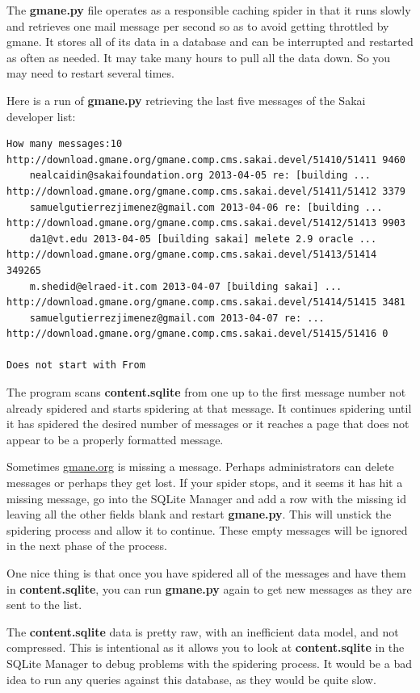 The {\bf gmane.py} file operates as a responsible caching spider in 
that it runs slowly and retrieves one mail message per second so 
as to avoid getting throttled by gmane.   It stores all of
its data in a database and can be interrupted and restarted 
as often as needed.   It may take many hours to pull all the data
down.  So you may need to restart several times.

Here is a run of {\bf gmane.py} retrieving the last five messages of the
Sakai developer list:

\beforeverb
\begin{verbatim}
How many messages:10
http://download.gmane.org/gmane.comp.cms.sakai.devel/51410/51411 9460
    nealcaidin@sakaifoundation.org 2013-04-05 re: [building ...
http://download.gmane.org/gmane.comp.cms.sakai.devel/51411/51412 3379
    samuelgutierrezjimenez@gmail.com 2013-04-06 re: [building ...
http://download.gmane.org/gmane.comp.cms.sakai.devel/51412/51413 9903
    da1@vt.edu 2013-04-05 [building sakai] melete 2.9 oracle ...
http://download.gmane.org/gmane.comp.cms.sakai.devel/51413/51414 349265
    m.shedid@elraed-it.com 2013-04-07 [building sakai] ...
http://download.gmane.org/gmane.comp.cms.sakai.devel/51414/51415 3481
    samuelgutierrezjimenez@gmail.com 2013-04-07 re: ...
http://download.gmane.org/gmane.comp.cms.sakai.devel/51415/51416 0

Does not start with From 
\end{verbatim}
\afterverb
%
The program scans {\bf content.sqlite} from one up to the first message number not
already spidered and starts spidering at that message.  It continues spidering
until it has spidered the desired number of messages or it reaches a page
that does not appear to be a properly formatted message.

Sometimes \url{gmane.org} is missing a message.  Perhaps administrators can delete messages
or perhaps they get lost.   If your spider stops, and it seems it has hit
a missing message, go into the SQLite Manager and add a row with the missing id leaving
all the other fields blank and restart {\bf gmane.py}.   This will unstick the 
spidering process and allow it to continue.  These empty messages will be ignored in the next
phase of the process.

One nice thing is that once you have spidered all of the messages and have them in 
{\bf content.sqlite}, you can run {\bf gmane.py} again to get new messages as 
they are sent to the list.  

The {\bf content.sqlite} data is pretty raw, with an inefficient data model, 
and not compressed.
This is intentional as it allows you to look at {\bf content.sqlite}
in the SQLite Manager to debug problems with the spidering process.
It would be a bad idea to run any queries against this database, as they 
would be quite slow.

